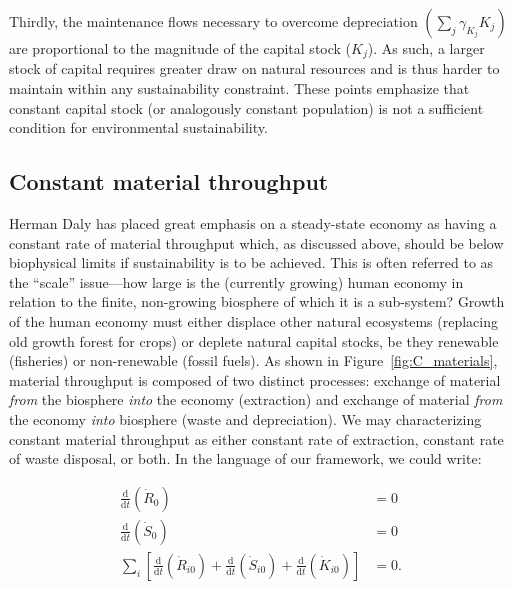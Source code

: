 Thirdly,
the maintenance flows necessary to overcome
depreciation
$\left(\sum_{j}\gamma_{K_{j}}K_{j}\right)$
are proportional to the magnitude of the capital
stock ($K_{j}$).
As such,
a larger stock of capital requires
greater draw on natural resources and is thus harder
to maintain within any sustainability constraint.
These points emphasize that constant capital stock
(or analogously constant population)
is not a sufficient condition for environmental sustainability.


\subsection{Constant material throughput}

Herman Daly has placed great emphasis on a steady-state
economy as having a constant rate of material throughput 
\cite{Daly1977, Daly1997}
which, as discussed above, should be below biophysical limits
if sustainability is to be achieved.
This is often referred to as the ``scale'' issue---how 
large is the (currently growing) human economy in relation
to the finite, non-growing biosphere of which it is a sub-system?
Growth of the human economy must either displace other natural
ecosystems (replacing old growth forest for crops)
or deplete natural capital stocks, be they 
renewable (fisheries) or 
non-renewable (fossil fuels).
As shown in Figure~\ref{fig:C_materials},
material throughput is composed of two distinct processes:
exchange of material \emph{from} the biosphere 
\emph{into} the economy (extraction)
and exchange of material \emph{from} the economy
\emph{into} biosphere (waste and depreciation).
We may characterizing constant material throughput
as either constant rate of extraction, constant rate of
waste disposal, or both.
In the language of our framework, we could write:

\begin{align}\label{eq:const_throughput}
	\frac{\mathrm{d}}{\mathrm{d}t}\left(\dot{R}_{0}\right)		&
	= 0																							\\
	\frac{\mathrm{d}}{\mathrm{d}t}\left(\dot{S}_{0}\right)		&
	= 0																						\\
	\sum\limits_{i}
			\left[
				\frac{\mathrm{d}}{\mathrm{d}t}\left(\dot{R}_{i0}\right)
				+ \frac{\mathrm{d}}{\mathrm{d}t}\left(\dot{S}_{i0}\right)
				+ \frac{\mathrm{d}}{\mathrm{d}t}\left(\dot{K}_{i0}\right)
			\right]																			&
	= 0.
\end{align}

